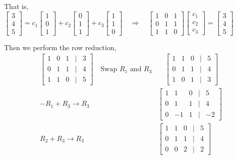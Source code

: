 \documentclass[a4paper,11pt,reqno]{amsart}
\numberwithin{equation}{section}
\begin{document}
\begin{enumerate}
\begin{center}
{{    That is, 
    \(
    \begin{bmatrix} 3 \\ 4 \\ 5 \end{bmatrix}
    = c_1 \begin{bmatrix} 1 \\ 0 \\ 1 \end{bmatrix}
    + c_2 \begin{bmatrix} 0 \\ 1 \\ 1 \end{bmatrix}
    + c_3 \begin{bmatrix} 1 \\ 1 \\ 0 \end{bmatrix}
    \quad \Rightarrow \quad 
    \begin{bmatrix} 1 & 0 & 1 \\ 0 & 1 & 1 \\ 1 & 1 & 0 \end{bmatrix}
    \begin{bmatrix} c_1 \\ c_2 \\ c_3 \end{bmatrix}
    = \begin{bmatrix} 3 \\ 4 \\ 5 \end{bmatrix}
    \)
  
    Then we perform the row reduction,
    \begin{eqnarray*}
    \begin{bmatrix}
    1 & 0 & 1 & | & 3 \\
    0 & 1 & 1 & | & 4 \\
    1 & 1 & 0 & | & 5
    \end{bmatrix}
    \quad
    \text{Swap } R_1\text{ and }R_3&
    \quad
    \begin{bmatrix}
    1 & 1 & 0 & | & 5 \\
    0 & 1 & 1 & | & 4 \\
    1 & 0 & 1 & | & 3
    \end{bmatrix}\\
    -R_1 + R_3 \rightarrow R_3&
    \begin{bmatrix}
    1 & 1 & 0 & | & 5 \\
    0 & 1 & 1 & | & 4 \\
    0 & -1 & 1 & | & -2
    \end{bmatrix}\\
     R_2 + R_3 \rightarrow R_3&
    \begin{bmatrix}
    1 & 1 & 0 & | & 5 \\
    0 & 1 & 1 & | & 4 \\
    0 & 0 & 2 & | & 2
    \end{bmatrix}
    \end{eqnarray*}

}}
\end{center}
\end{enumerate}
\end{document}
